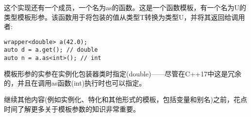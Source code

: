 这个实现还有一个成员，一个名为as的函数。这是一个函数模板，有一个名为U的类型模板形参。该函数用于将包装的值从类型T转换为类型U，并将其返回给调用者:


\begin{lstlisting}[style=styleCXX]
wrapper<double> a(42.0);
auto d = a.get(); // double
auto n = a.as<int>(); // int
\end{lstlisting}

模板形参的实参在实例化包装器类时指定(double)——尽管在C++17中这是冗余的，并且在调用as函数(int)执行时也可以指定。

继续其他内容(例如实例化、特化和其他形式的模板，包括变量和别名)之前，花点时间了解更多关于模板参数的知识非常重要。







